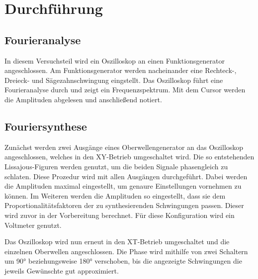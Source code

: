 \section{Durchführung}
\label{sec:Durchführung}


\subsection{Fourieranalyse}

In diesem Versuchsteil wird ein Oszilloskop an einen Funktionsgenerator angeschlossen.
Am Funktionsgenerator werden nacheinander eine Rechteck-, Dreieck- und Sägezahnschwingung eingstellt.
Das Oszilloskop führt eine Fourieranalyse durch und zeigt ein Frequenzspektrum.
Mit dem Cursor werden die Amplituden abgelesen und anschließend notiert.

\subsection{Fouriersynthese}

Zunächst werden zwei Ausgänge eines Oberwellengenerator an das Oszilloskop angeschlossen, welches in den XY-Betrieb umgeschaltet wird.
Die so entstehenden Lissajous-Figuren werden genutzt, um die beiden Signale phasengleich zu schlaten.
Diese Prozedur wird mit allen Ausgängen durchgeführt.
Dabei werden die Amplituden maximal eingestellt, um genaure Einstellungen vornehmen zu können.
Im Weiteren werden die Amplituden so eingestellt, dass sie dem Proportionalitätsfaktoren der zu synthesierenden Schwingungen passen. Dieser wird zuvor in der Vorbereitung berechnet.
Für diese Konfiguration wird ein Voltmeter genutzt.

Das Oszilloskop wird nun erneut in den XT-Betrieb umgeschaltet und die einzelnen Oberwellen angeschlossen.
Die Phase wird mithilfe von zwei Schaltern um 90° beziehungsweise 180° verschoben, bis die angezeigte Schwingungen die jeweils Gewünschte gut approximiert.

